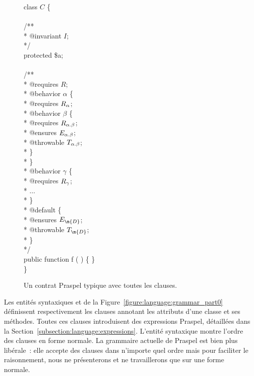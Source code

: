 \begin{figure}
\begin{bigpre}
class \(C\) \{ \\
\\
    /** \\
     * @invariant \(I\); \\
     */ \\
    protected \$a; \\
\\
    /** \\
     * @requires \(R\); \\
     * @behavior \(\alpha\) \{ \\
     *     @requires \(R\sb{\alpha}\); \\
     *     @behavior \(\beta\) \{ \\
     *         @requires  \(R\sb{\alpha.\beta}\); \\
     *         @ensures   \(E\sb{\alpha.\beta}\); \\
     *         @throwable \(T\sb{\alpha.\beta}\); \\
     *     \} \\
     * \} \\
     * @behavior \(\gamma\) \{ \\
     *     @requires \(R\sb{\gamma}\); \\
     *     \(\dots\) \\
     * \} \\
     * @default \{ \\
     *     @ensures   \(E\sb{\m{D}}\); \\
     *     @throwable \(T\sb{\m{D}}\); \\
     * \} \\
     */ \\
    public function f ( ) \{ \} \\
\}
\end{bigpre}

\caption{\label{figure:language:typical_contract} Un contrat Praspel typique
avec toutes les clauses.}

\end{figure}

Les entités syntaxiques  et  de
la Figure~\ref{figure:language:grammar_part0} définissent respectivement les
clauses annotant les attributs d'une classe et ses méthodes. Toutes ces clauses
introduisent des expressions Praspel, détaillées dans la
Section~\ref{subsection:language:expressions}. L'entité syntaxique
 montre l'ordre des clauses en forme normale. La grammaire
actuelle de Praspel est bien plus libérale~: elle accepte des clauses dans
n'importe quel ordre mais pour faciliter le raisonnement, nous ne présenterons
et ne travaillerons que sur une forme normale.

